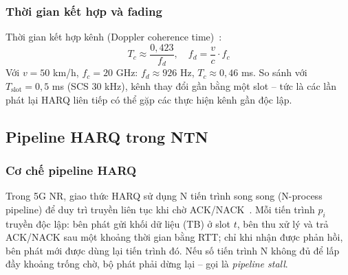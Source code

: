 \subsubsection{Thời gian kết hợp và fading}

Thời gian kết hợp kênh (Doppler coherence time)~\cite{tuninato2025}:
\begin{equation}\label{eq:coherence}
    T_c \approx \frac{0{,}423}{f_d}, \quad f_d = \frac{v}{c} \cdot f_c
\end{equation}
Với $v = 50$ km/h, $f_c = 20$ GHz: $f_d \approx 926$ Hz, $T_c \approx 0{,}46$ ms. So sánh với $T_{\text{slot}} = 0{,}5$ ms (SCS 30 kHz), kênh thay đổi gần bằng một slot -- tức là các lần phát lại HARQ liên tiếp có thể gặp các thực hiện kênh gần độc lập.

\subsection{Pipeline HARQ trong NTN}

\subsubsection{Cơ chế pipeline HARQ}

Trong 5G NR, giao thức HARQ sử dụng N tiến trình song song (N-process pipeline) để duy trì truyền liên tục khi chờ ACK/NACK~\cite{ts38321}. Mỗi tiến trình $p_i$ truyền độc lập: bên phát gửi khối dữ liệu (TB) ở slot $t$, bên thu xử lý và trả ACK/NACK sau một khoảng thời gian bằng RTT; chỉ khi nhận được phản hồi, bên phát mới được dùng lại tiến trình đó. Nếu số tiến trình N không đủ để lấp đầy khoảng trống chờ, bộ phát phải dừng lại -- gọi là \textit{pipeline stall}.

